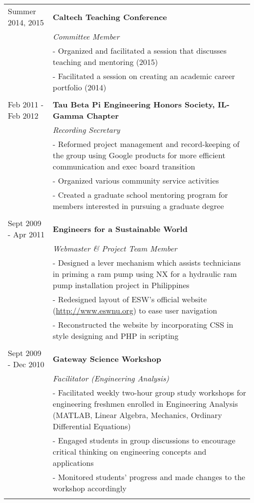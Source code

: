 \documentclass[letterpaper]{article}
\begin{document}
\begin{tabular*}{\textwidth}{@{\extracolsep{\fill}} l l}
Summer 2014, 2015 &\textbf{Caltech Teaching Conference}\\ 
& \textit{Committee Member} \\
&\multicolumn{1}{p{0.8\textwidth}}{- Organized and facilitated a session that discusses teaching and mentoring (2015)  } \\
&\multicolumn{1}{p{0.8\textwidth}}{- Facilitated a session on creating an academic career portfolio (2014)  } \\ \\

Feb 2011 - Feb 2012 &\textbf{Tau Beta Pi Engineering Honors Society, IL-Gamma Chapter}\\
& \textit{Recording Secretary} \\
 & \multicolumn{1}{p{0.8\textwidth}}{- Reformed project management and record-keeping of the group using Google products for more efficient communication and exec board transition} \\
&\multicolumn{1}{p{0.8\textwidth}}{- Organized various community service activities} \\
&\multicolumn{1}{p{0.8\textwidth}}{- Created a graduate school mentoring program for members interested in pursuing a graduate degree} \\ \\

Sept 2009 - Apr 2011 &\textbf{Engineers for a Sustainable World}\\
& \textit{Webmaster \& Project Team Member} \\
 & \multicolumn{1}{p{0.8\textwidth}}{- Designed a lever mechanism which assists technicians in priming a ram pump using NX for a hydraulic ram pump installation project in Philippines} \\
&\multicolumn{1}{p{0.8\textwidth}}{- Redesigned layout of ESW's official website (\href{http://www.eswnu.org}{http://www.eswnu.org}) to ease user navigation} \\
&\multicolumn{1}{p{0.8\textwidth}}{- Reconstructed the website by incorporating CSS in style designing and PHP in scripting} \\ \\

Sept 2009 - Dec 2010 &\textbf{Gateway Science Workshop}\\
& \textit{Facilitator (Engineering Analysis)} \\
 & \multicolumn{1}{p{0.8\textwidth}}{- Facilitated weekly two-hour group study workshops for engineering freshmen enrolled in Engineering Analysis (MATLAB, Linear Algebra, Mechanics, Ordinary Differential Equations)} \\
&\multicolumn{1}{p{0.8\textwidth}}{- Engaged students in group discussions to encourage critical thinking on engineering concepts and applications} \\
&\multicolumn{1}{p{0.8\textwidth}}{- Monitored students' progress and made changes to the workshop accordingly} \\ \\


\end{tabular*}
\end{document}
